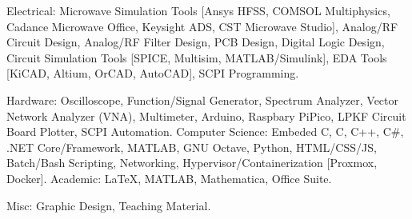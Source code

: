 

\begin{cvskills}

  \cvskill
    {Electrical:} %
    {Microwave Simulation Tools [Ansys HFSS, COMSOL Multiphysics, Cadance Microwave Office, Keysight ADS, CST Microwave Studio], Analog/RF Circuit Design, Analog/RF Filter Design, PCB Design, Digital Logic Design, Circuit Simulation Tools [SPICE, Multisim, MATLAB/Simulink], EDA Tools [KiCAD, Altium, OrCAD, AutoCAD], SCPI Programming.} %

\cvskill
    {Hardware:}
    {Oscilloscope, Function/Signal Generator, Spectrum Analyzer, Vector Network Analyzer (VNA), Multimeter, Arduino, Raspbary PiPico, LPKF Circuit Board Plotter, SCPI Automation. }
  \cvskill
    {Computer Science:} %
    {Embeded C, C, C++, C\#, .NET Core/Framework, MATLAB, GNU Octave, Python, HTML/CSS/JS, Batch/Bash Scripting, Networking, Hypervisor/Containerization [Proxmox, Docker].} %
  \cvskill
    {Academic:} %
    {\LaTeX, MATLAB, Mathematica, Office Suite.} %


  \cvskill
    {Misc:} %
    {Graphic Design, Teaching Material.} %
\end{cvskills}
